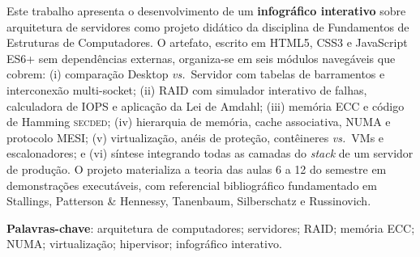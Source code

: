 \documentclass[
    12pt,
    openright,
    oneside,
    a4paper,
    chapter=TITLE,
    section=TITLE,
    brazil
]{abntex2}
\begin{document}
\frenchspacing

\pretextual
\imprimircapa
\imprimirfolhaderosto

\begin{resumo}
Este trabalho apresenta o desenvolvimento de um \textbf{infográfico interativo} sobre
arquitetura de servidores como projeto didático da disciplina de Fundamentos de
Estruturas de Computadores. O artefato, escrito em HTML5, CSS3 e JavaScript ES6+
sem dependências externas, organiza-se em seis módulos navegáveis que cobrem:
(i) comparação Desktop \textit{vs.}\ Servidor com tabelas de barramentos e
interconexão multi-socket; (ii) RAID com simulador interativo de falhas,
calculadora de IOPS e aplicação da Lei de Amdahl; (iii) memória ECC e código
de Hamming \textsc{secded}; (iv) hierarquia de memória, cache associativa,
NUMA e protocolo MESI; (v) virtualização, anéis de proteção, contêineres
\textit{vs.}\ VMs e escalonadores; e (vi) síntese integrando todas as camadas
do \emph{stack} de um servidor de produção. O projeto materializa a teoria das
aulas 6 a 12 do semestre em demonstrações executáveis, com referencial
bibliográfico fundamentado em Stallings, Patterson \& Hennessy, Tanenbaum,
Silberschatz e Russinovich.

\textbf{Palavras-chave}: arquitetura de computadores; servidores; RAID;
memória ECC; NUMA; virtualização; hipervisor; infográfico interativo.
\end{resumo}

\tableofcontents*
\cleardoublepage

\textual







\postextual



\begin{anexosenv}
\partanexos

\end{anexosenv}
\end{document}
